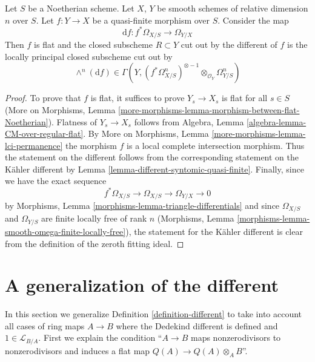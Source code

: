 \begin{lemma}
\label{lemma-discriminant-quasi-finite-morphism-smooth}
Let $S$ be a Noetherian scheme. Let $X$, $Y$ be smooth schemes
of relative dimension $n$ over $S$. Let $f : Y \to X$ be a
quasi-finite morphism over $S$. Consider the map
$$
\text{d}f : f^*\Omega_{X/S} \longrightarrow \Omega_{Y/X}
$$
Then $f$ is flat and the closed subscheme $R \subset Y$
cut out by the different of $f$ is the locally principal
closed subscheme cut out by
$$
\wedge^n(\text{d}f) \in
\Gamma(Y,
(f^*\Omega^n_{X/S})^{\otimes -1} \otimes_{\mathcal{O}_Y} \Omega^n_{Y/S})
$$
\end{lemma}

\begin{proof}
To prove that $f$ is flat, it suffices to prove $Y_s \to X_s$
is flat for all $s \in S$ (More on Morphisms, Lemma
\ref{more-morphisms-lemma-morphism-between-flat-Noetherian}).
Flatness of $Y_s \to X_s$ follows from
Algebra, Lemma \ref{algebra-lemma-CM-over-regular-flat}.
By More on Morphisms, Lemma
\ref{more-morphisms-lemma-lci-permanence}
the morphism $f$ is a local complete intersection morphism.
Thus the statement on the different follows from the
corresponding statement on the K\"ahler different by
Lemma \ref{lemma-different-syntomic-quasi-finite}.
Finally, since we have the exact sequence
$$
f^*\Omega_{X/S} \to \Omega_{X/S} \to \Omega_{Y/X} \to 0
$$
by Morphisms, Lemma \ref{morphisms-lemma-triangle-differentials}
and since $\Omega_{X/S}$ and $\Omega_{Y/S}$ are finite locally free
of rank $n$ (Morphisms, Lemma
\ref{morphisms-lemma-smooth-omega-finite-locally-free}),
the statement for the K\"ahler different is clear from the definition
of the zeroth fitting ideal.
\end{proof}






\section{A generalization of the different}
\label{section-different-generalization}

\noindent
In this section we generalize Definition \ref{definition-different}
to take into account all cases of ring maps $A \to B$
where the Dedekind different is defined and $1 \in \mathcal{L}_{B/A}$.
First we explain the condition ``$A \to B$ maps nonzerodivisors to
nonzerodivisors and induces a flat map $Q(A) \to Q(A) \otimes_A B$''.

